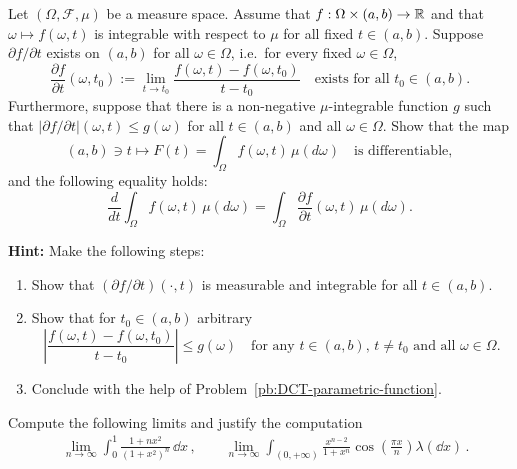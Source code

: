 \begin{problem}
		Let $(\Omega,\mathcal{F},\mu)$ be a measure space. Assume that $f:\Omega\times(a,b)\to\mathbb R$ and that $\omega\mapsto f(\omega,t)$ is integrable with respect to $\mu$ for all fixed $t\in(a,b)$. Suppose $\partial f/\partial t$ exists on $(a,b)$ for all $\omega\in \Omega$, i.e.\ for every fixed $\omega\in\Omega$,
		\[
			\frac{\partial f}{\partial t}(\omega, t_0):=\lim_{t\to t_0} \frac{f(\omega,t)-f(\omega,t_0)}{t-t_0} \quad\text{exists for all $t_0\in(a,b)$}.
		\]
		Furthermore, suppose that there is a non-negative $\mu$-integrable function $g$ such that $|\partial f/\partial t|(\omega,t)\le g(\omega)$ for all $t\in(a,b)$ and all $\omega\in\Omega$. Show that the map
		\[
			(a,b)\ni t\mapsto F(t) = \int_\Omega f(\omega,t)\,\mu(d\omega)\quad\text{is differentiable},
		\]
		and the following equality holds:
		\[
			\frac{d}{dt}\int_\Omega f(\omega,t)\,\mu(d\omega) = \int_\Omega \frac{\partial f}{\partial t}(\omega,t)\,\mu(d\omega).
		\]
		
		\smallskip
		
		\noindent\textbf{Hint:} Make the following steps:
		\begin{enumerate}[label={(\arabic*)}]
			\item Show that $(\partial f/\partial t)(\cdot,t)$ is measurable and integrable for all $t\in(a,b)$.
			\item Show that for $t_0\in(a,b)$ arbitrary
			\[
				\left|\frac{f(\omega,t)-f(\omega,t_0)}{t-t_0}\right| \le g(\omega)\quad\text{for any $t\in(a,b)$, $t\ne t_0$ and all $\omega\in\Omega$.}
			\]
			\item Conclude with the help of Problem~\ref{pb:DCT-parametric-function}.
		\end{enumerate}
\end{problem}

\begin{problem}
	Compute the following limits and justify the computation
	\begin{align*}
		& \lim_{n\to\infty} \int_0^1 \frac{1 + n x^2}{(1 + x^2)^n}\,\dd x\,,\qquad\lim_{n\to\infty} \int_{(0,+\infty)} \frac{x^{n-2}}{1+ x^n}\cos\left(\frac{\pi x}{n}\right) \lambda(\dd x) \,.
	\end{align*}
\end{problem}




